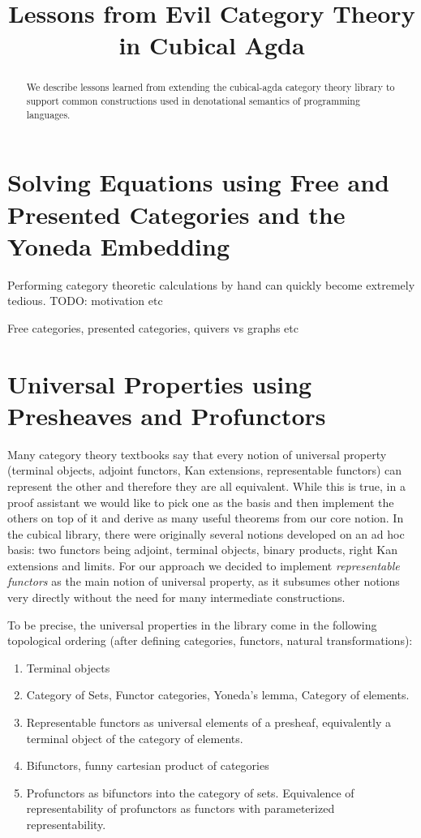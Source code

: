 \documentclass{article}
\begin{document}
\title{Lessons from Evil Category Theory in Cubical Agda}

\begin{abstract}
  We describe lessons learned from extending the cubical-agda category
  theory library to support common constructions used in denotational
  semantics of programming languages.
\end{abstract}

\section{Solving Equations using Free and Presented Categories and the Yoneda Embedding}

Performing category theoretic calculations by hand can quickly become extremely tedious. TODO: motivation etc

Free categories, presented categories, quivers vs graphs etc

\section{Universal Properties using Presheaves and Profunctors}

Many category theory textbooks say that every notion of universal
property (terminal objects, adjoint functors, Kan extensions,
representable functors) can represent the other and therefore they are
all equivalent. While this is true, in a proof assistant we would like
to pick one as the basis and then implement the others on top of it
and derive as many useful theorems from our core notion.  In the
cubical library, there were originally several notions developed on an
ad hoc basis: two functors being adjoint, terminal objects, binary
products, right Kan extensions and limits. For our approach we decided
to implement \emph{representable functors} as the main notion of
universal property, as it subsumes other notions very directly without
the need for many intermediate constructions.

To be precise, the universal properties in the library come in the
following topological ordering (after defining categories, functors, natural transformations):
\begin{enumerate}
\item Terminal objects
\item Category of Sets, Functor categories, Yoneda's lemma, Category of elements.
\item Representable functors as universal elements of a presheaf,
  equivalently a terminal object of the category of elements.
\item Bifunctors, funny cartesian product of categories
\item Profunctors as bifunctors into the category of sets. Equivalence
  of representability of profunctors as functors with parameterized
  representability.
\end{enumerate}
\end{document}
